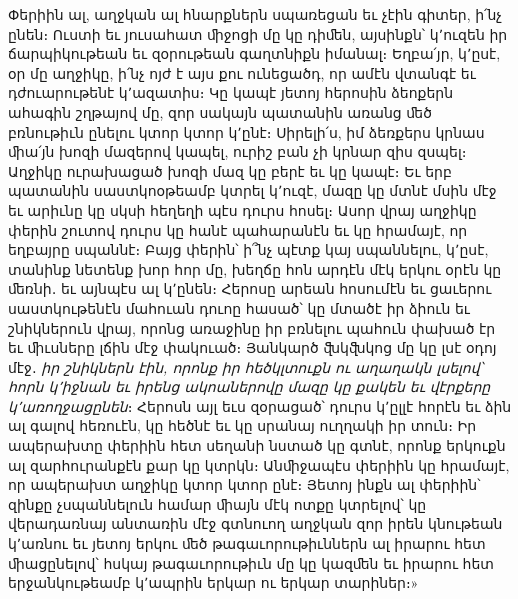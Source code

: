 \documentclass{article}
\begin{document}
{Փերիին ալ, աղջկան ալ հնարքներն սպառեցան եւ չէին գիտեր, ի՛նչ ընեն։ Ուստի եւ յուսահատ ﬕջոցի մը կը դիﬔն, այսինքն՝ կ՚ուզեն իր ճարպիկութեան եւ զօրութեան գաղտնիքն իմանալ։ Եղբա՛յր, կ՚ըսէ, օր մը աղջիկը, ի՛նչ ոյժ է այս քու ունեցածդ, որ ամէն վտանգէ եւ դժուարութենէ կ՚ազատիս։ Կը կապէ յետոյ հերոսին ձեոքերն ահագին շղթայով մը, զոր սակայն պատանին առանց ﬔծ բռնութիւն ընելու կտոր կտոր կ՚ընէ։ Սիրելի՛ս, իմ ձեռքերս կրնաս ﬕա՛յն խոզի մազերով կապել, ուրիշ բան չի կրնար զիս զսպել։ Աղջիկը ուրախացած խոզի մազ կը բերէ եւ կը կապէ։ Եւ երբ պատանին սաստկոօթեամբ կտրել կ՚ուզէ, մազը կը մտնէ մսին մէջ եւ արիւնը կը սկսի հեղեղի պէս դուրս հոսել։ Ասոր վրայ աղջիկը փերին շուտով դուրս կը հանէ պահարանէն եւ կը հրամայէ, որ եղբայրը սպաննէ։ Բայց փերին՝ ի՞նչ պէտք կայ սպաննելու, կ՚ըսէ, տանինք նետենք խոր հոր մը, խեղճը հոն արդէն մէկ երկու օրէն կը ﬔռնի․ եւ այնպէս ալ կ՚ընեն։ Հերոսը արեան հոսումէն եւ ցաւերու սաստկութենէն մահուան դուոը հասած՝ կը մտածէ իր ձիուն եւ շնիկներուն վրայ, որոնց առաջինը իր բռնելու պահուն փախած էր եւ ﬕւսները լճին մէջ փակուած։ Յանկարծ ﬖկﬖկոց մը կը լսէ օդոյ մէջ․ \emph{իր շնիկներն էին, որոնք իր հեծկլտուքն ու աղաղակն լսելով՝ հորն կ՚իջնան եւ իրենց ակոաներովը մազը կը քակեն եւ վէրքերը կ՚առողջացընեն}։ Հերոսն այլ եւս զօրացած՝ դուրս կ՚ըլլէ հորէն եւ ձին ալ գալով հեռուէն, կը հեծնէ եւ կը սրանայ ուղղակի իր տուն։ Իր ապերախտը փերիին հետ սեղանի նստած կը գտնէ, որոնք երկուքն ալ զարհուրանքէն քար կը կտրկն։ Անﬕջապէս փերիին կը հրամայէ, որ ապերախտ աղջիկը կտոր կտոր ընէ։ Յետոյ ինքն ալ փերիին՝ զինքը չսպաննելուն համար ﬕայն մէկ ոտքը կտրելով՝ կը վերադառնայ անտառին մէջ գտնուող աղջկան զոր իրեն կնութեան կ՚առնու եւ յետոյ երկու ﬔծ թագաւորութիւններն ալ իրարու հետ ﬕացընելով՝ հսկայ թագաւորութիւն մը կը կազﬔն եւ իրարու հետ երջանկութեամբ կ՚ապրին երկար ու երկար տարիներ։»

}
\end{document}
